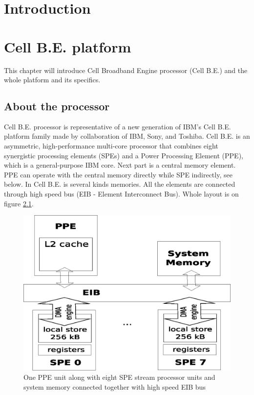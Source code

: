 \chapter{Introduction}

\chapter{Cell B.E. platform}

This chapter will introduce Cell Broadband Engine processor (Cell B.E.) and the whole platform and its specifics.

\section{About the processor}

Cell B.E. processor is representative of a new generation of IBM's Cell B.E. platform family made by collaboration of IBM, Sony, and Toshiba.
Cell B.E. is an asymmetric, high-performance multi-core processor that combines eight synergistic processing elements (SPEs) and a Power Processing Element (PPE), which is a general-purpose IBM  core.
Next part is a central memory element.
PPE can operate with the central memory directly while SPE indirectly, see below.
In Cell B.E. is several kinds memories.
All the elements are connected through high speed bus (EIB - Element Interconnect Bus).
Whole layout is on figure \ref{fg:processorLayout}.

\begin{figure}
    \centering
    \includegraphics[width=\textwidth]{data/cellLayout}
    \caption[Cell B.E. processor layout]{One PPE unit along with eight SPE stream processor units and system memory connected together with high speed EIB bus}
    \label{fg:processorLayout}
\end{figure}

